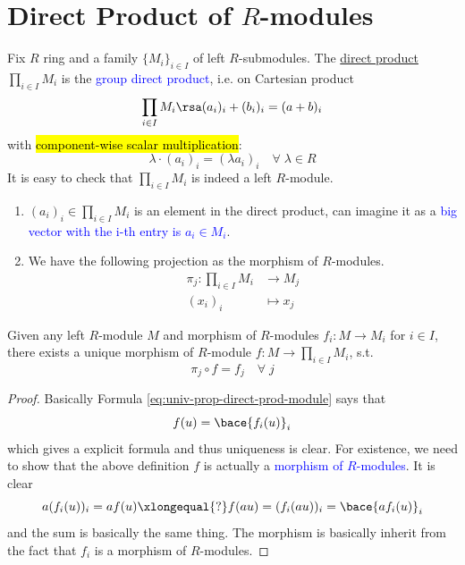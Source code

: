 \section{Direct Product of \( R \)-modules}

\begin{definition}
	Fix \( R \) ring and a family \( \{M_i\}_{i\in I} \) of left \( R \)-submodules. The
	\underline{direct product} \( \prod_{i\in I}M_i \) is the \textcolor{blue}{group direct product},
	i.e. on Cartesian product
	\[
		\prod_{i\in I} M_i \rsa (a_i)_i +(b_i)_i = (a+b)_i
	\]
	with \hl{component-wise scalar multiplication}:
	\[
		\lambda \cdot (a_i)_i = (\lambda a_i)_i \quad \forall \; \lambda \in R
	\]
	It is easy to check that \( \prod_{i\in I} M_i \) is indeed a left \( R \)-module.
\end{definition}

\begin{remark}
	\leavevmode
	\begin{enumerate}
		\item \( (a_i)_i \in \prod_{i\in I}M_i \) is an element in the direct product, can imagine it as
		      a \textcolor{blue}{big vector with the i-th entry is \( a_i \in M_i \)}.
		\item We have the following projection as the morphism of \( R \)-modules.
		      \[
			      \begin{aligned}
				      \pi_j : \prod_{i\in I} M_i & \to M_j     \\
				      (x_i)_i                    & \mapsto x_j
			      \end{aligned}
		      \]
	\end{enumerate}
\end{remark}

\begin{proposition}
	Given any left \( R \)-module \( M \) and morphism of \( R \)-modules \( f_i: M \to M_i \) for \(
	i\in I\), there exists a unique morphism of \( R \)-module \( f: M \to \prod_{i\in I} M_i \), s.t.
	\begin{equation}
		\label{eq:univ-prop-direct-prod-module}
		\pi_j \circ f = f_j \quad \forall \; j
	\end{equation}
\end{proposition}

\begin{proof}
	Basically Formula \ref{eq:univ-prop-direct-prod-module} says that
	\[
		f(u) = \bace{f_i(u)}_i
	\]
	which gives a explicit formula and thus uniqueness is clear. For existence, we need to show that
	the above definition \( f \) is actually a \textcolor{blue}{morphism of \( R \)-modules}. It is
	clear
	\[
		a(f_i(u))_i = a f(u) \xlongequal{?} f(au) = (f_i(au))_i = \bace{a f_i(u)}_i
	\]
	and the sum is basically the same thing. The morphism is basically inherit from the fact that \(
	f_i \) is a morphism of \( R \)-modules.
\end{proof}

